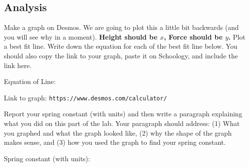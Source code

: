 \documentclass[10pt]{exam}
\begin{document}
\subsection*{Analysis}
Make a graph on Desmos.  We are going to plot this a little bit backwards (and you will see why in a moment).  \textbf{Height should be $x$, Force should be $y$.}  Plot a best fit line.  Write down the equation for each of the best fit line below.  You should also copy the link to your graph, paste it on Schoology, and include the link here.


    \vspace{1em}

    Equation of Line:

    \vspace{2em}

    Link to graph: \texttt{https://www.desmos.com/calculator/}\fillin[][15em]


    \vspace{2em}

\noindent
Report your spring constant (with units) and then write a paragraph explaining what you did on this part of the lab.  Your paragraph should address: (1) What you graphed and what the graph looked like, (2) why the shape of the graph makes sense, and (3) how you used the graph to find your spring constant.

\vspace{1em}

Spring constant (with units): \fillin[][15em]

\vs
\end{document}
